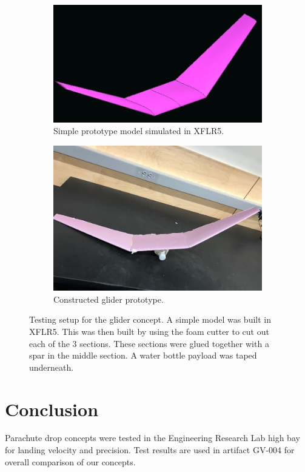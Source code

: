 \documentclass[]{auvsi_doc}
\begin{document}
\begin{figure}[h!]
	\centering
	\begin{subfigure}{0.49\linewidth} \centering
		\includegraphics[width=.95\columnwidth]{glider1.jpg}
		\caption{Simple prototype model simulated in XFLR5.}
		\label{fig:glidermodel}
	\end{subfigure}
	\begin{subfigure}{0.49\linewidth} \centering
		\includegraphics[width=.95\columnwidth]{glider2.jpg}
		\caption{Constructed glider prototype.}
		\label{fig:glider}
	\end{subfigure}
	\caption{Testing setup for the glider concept. A simple model was built in XFLR5. This was then built by using the foam cutter to cut out each of the 3 sections. These sections were glued together with a spar in the middle section. A water bottle payload was taped underneath.}
	\label{fig:combinedglider}
\end{figure}

\newpage

\section{Conclusion}
Parachute drop concepts were tested in the Engineering Research Lab high bay for landing velocity and precision. Test results are used in artifact GV-004 for overall comparison of our concepts.
\end{document}
